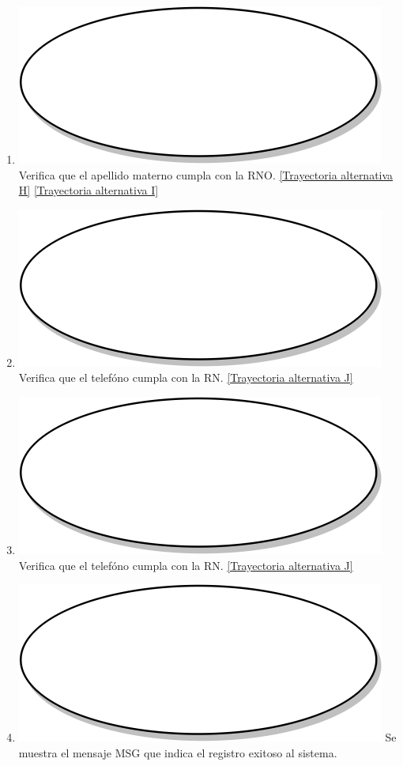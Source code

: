 \begin{enumerate}
  \item {\includegraphics[scale=.05]{Capitulo3/img/proceso.png} Verifica que el apellido materno cumpla con la RNO. \hyperref[cu2_ta_h]{[Trayectoria alternativa H]} \hyperref[cu2_ta_i]{[Trayectoria alternativa I]}}
  \item {\includegraphics[scale=.05]{Capitulo3/img/proceso.png} Verifica que el telefóno cumpla con la RN. \hyperref[cu2_ta_j]{[Trayectoria alternativa J]}}
  \item {\includegraphics[scale=.05]{Capitulo3/img/proceso.png} Verifica que el telefóno cumpla con la RN. \hyperref[cu2_ta_j]{[Trayectoria alternativa J]}}
  \item {\includegraphics[scale=.05]{Capitulo3/img/proceso.png} Se muestra el mensaje MSG que indica el registro exitoso al sistema.}

\end{enumerate}
